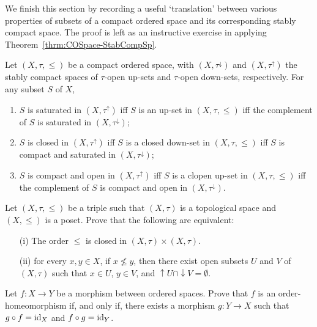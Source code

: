 We finish this section by recording a useful `translation' between various properties of subsets of a compact ordered space and its corresponding stably compact space. The proof is left as an instructive exercise in applying Theorem~\ref{thrm:COSpace-StabCompSp}.
\begin{proposition}\label{prop:with-without-order-scs}
Let $(X,\tau,\leq)$ be a compact ordered space, with $(X,\tau^\downarrow)$ and $(X,\tau^\uparrow)$ the stably compact spaces of $\tau$-open up-sets and $\tau$-open down-sets, respectively. For any subset $S$ of $X$,
\begin{enumerate}
  \item $S$ is saturated in $(X,\tau^{\uparrow})$ iff $S$ is an up-set in $(X,\tau,\leq)$ iff the complement of $S$ is saturated in $(X,\tau^{\downarrow})$;
  \item $S$ is closed in $(X,\tau^{\uparrow})$ iff $S$ is a closed down-set in $(X,\tau,\leq)$ iff $S$ is compact and saturated in $(X,\tau^{\downarrow})$;
  \item \label{itm:koisclup} $S$ is compact and open in $(X,\tau^{\uparrow})$ iff $S$ is a clopen up-set in $(X,\tau,\leq)$ iff the complement of $S$ is compact and open in $(X,\tau^{\downarrow})$.
\end{enumerate}
\end{proposition}
 


\exercises
\begin{exercise}\label{exe:compordaltdef}
Let $(X,\tau,\leq)$ be a triple such that $(X,\tau)$ is a topological space and $(X,\leq)$ is a poset. Prove that the following are equivalent:
\begin{enumerate}
\item[(i)] The order $\leq$ is closed in $(X,\tau) \times (X,\tau)$.
\item[(ii)] for every $x, y \in X$, if $x \nleq y$, then there exist open subsets $U$ and $V$ of $(X,\tau)$ such that $x \in U$, $y \in V$, and ${\uparrow}U \cap {\downarrow}V = \emptyset$.
\end{enumerate}
\end{exercise}

\begin{exercise}\label{exer:orderhomeo}
Let $f \colon X \to Y$ be a morphism between ordered spaces. Prove that $f$ is an order-homeomorphism if, and only if, there exists a morphism $g \colon Y \to X$ such that $g \circ f = \mathrm{id}_X$ and $f \circ g = \mathrm{id}_Y$.
\end{exercise}

